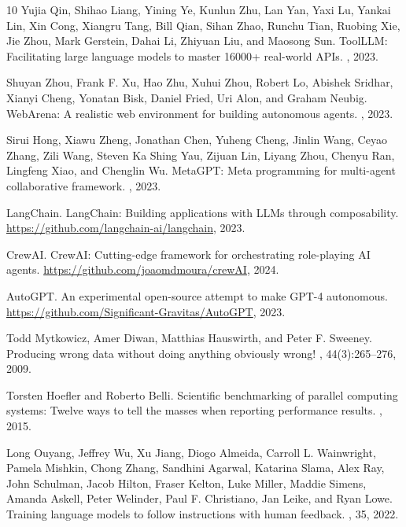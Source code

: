 \documentclass[sigconf,nonacm]{acmart}
\begin{document}
\begin{thebibliography}{10}
Yujia Qin, Shihao Liang, Yining Ye, Kunlun Zhu, Lan Yan, Yaxi Lu, Yankai Lin, Xin Cong, Xiangru Tang, Bill Qian, Sihan Zhao, Runchu Tian, Ruobing Xie, Jie Zhou, Mark Gerstein, Dahai Li, Zhiyuan Liu, and Maosong Sun.
\newblock ToolLLM: Facilitating large language models to master 16000+ real-world APIs.
, 2023.

Shuyan Zhou, Frank F. Xu, Hao Zhu, Xuhui Zhou, Robert Lo, Abishek Sridhar, Xianyi Cheng, Yonatan Bisk, Daniel Fried, Uri Alon, and Graham Neubig.
\newblock WebArena: A realistic web environment for building autonomous agents.
, 2023.

Sirui Hong, Xiawu Zheng, Jonathan Chen, Yuheng Cheng, Jinlin Wang, Ceyao Zhang, Zili Wang, Steven Ka Shing Yau, Zijuan Lin, Liyang Zhou, Chenyu Ran, Lingfeng Xiao, and Chenglin Wu.
\newblock MetaGPT: Meta programming for multi-agent collaborative framework.
, 2023.

LangChain.
\newblock LangChain: Building applications with LLMs through composability.
\newblock \url{https://github.com/langchain-ai/langchain}, 2023.

CrewAI.
\newblock CrewAI: Cutting-edge framework for orchestrating role-playing AI agents.
\newblock \url{https://github.com/joaomdmoura/crewAI}, 2024.

AutoGPT.
\newblock An experimental open-source attempt to make GPT-4 autonomous.
\newblock \url{https://github.com/Significant-Gravitas/AutoGPT}, 2023.

Todd Mytkowicz, Amer Diwan, Matthias Hauswirth, and Peter F. Sweeney.
\newblock Producing wrong data without doing anything obviously wrong!
, 44(3):265--276, 2009.

Torsten Hoefler and Roberto Belli.
\newblock Scientific benchmarking of parallel computing systems: Twelve ways to tell the masses when reporting performance results.
, 2015.

Long Ouyang, Jeffrey Wu, Xu Jiang, Diogo Almeida, Carroll L. Wainwright, Pamela Mishkin, Chong Zhang, Sandhini Agarwal, Katarina Slama, Alex Ray, John Schulman, Jacob Hilton, Fraser Kelton, Luke Miller, Maddie Simens, Amanda Askell, Peter Welinder, Paul F. Christiano, Jan Leike, and Ryan Lowe.
\newblock Training language models to follow instructions with human feedback.
, 35, 2022.


\end{thebibliography}
\end{document}
